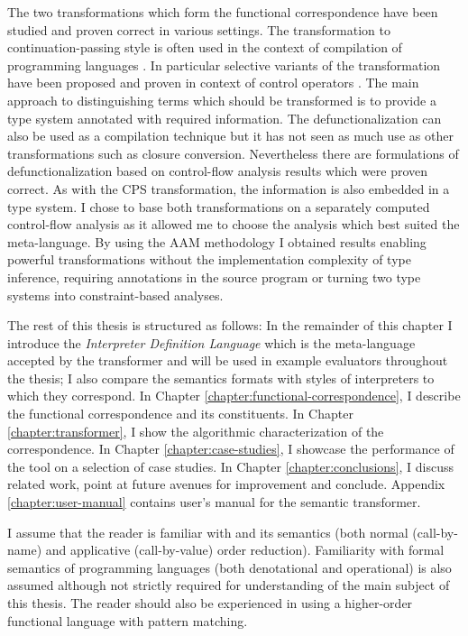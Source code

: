 The two transformations which form the functional correspondence have been studied and proven correct in various settings.
The transformation to continuation-passing style is often used in the context of compilation of programming languages \cite{appel-compiling-with-continuations}.
In particular selective variants of the transformation have been proposed and proven in context of control operators \cite{nielsen-cps}.
The main approach to distinguishing terms which should be transformed is to provide a type system annotated with required information.
The defunctionalization can also be used as a compilation technique but it has not seen as much use as other transformations such as closure conversion.
Nevertheless there are formulations of defunctionalization based on control-flow analysis results \cite{design-and-correctness-cfa} which were proven correct.
As with the CPS transformation, the information is also embedded in a type system.
I chose to base both transformations on a separately computed control-flow analysis as it allowed me to choose the analysis which best suited the meta-language.
By using the AAM methodology I obtained results enabling powerful transformations without the implementation complexity of type inference, requiring annotations in the source program or turning two type systems into constraint-based analyses.

The rest of this thesis is structured as follows:
In the remainder of this chapter I introduce the \textit{Interpreter Definition Language} which is the meta-language accepted by the transformer and will be used in example evaluators throughout the thesis; I also compare the semantics formats with styles of interpreters to which they correspond.
In Chapter \ref{chapter:functional-correspondence}, I describe the functional correspondence and its constituents.
In Chapter \ref{chapter:transformer}, I show the algorithmic characterization of the correspondence.
In Chapter \ref{chapter:case-studies}, I showcase the performance of the tool on a selection of case studies.
In Chapter \ref{chapter:conclusions}, I discuss related work, point at future avenues for improvement and conclude.
Appendix \ref{chapter:user-manual} contains user's manual for the semantic transformer. %

I assume that the reader is familiar with \LC{} and its semantics (both normal (call-by-name) and applicative (call-by-value) order reduction).
Familiarity with formal semantics of programming languages (both denotational and operational) is also assumed although not strictly required for understanding of the main subject of this thesis.
The reader should also be experienced in using a higher-order functional language with pattern matching.

